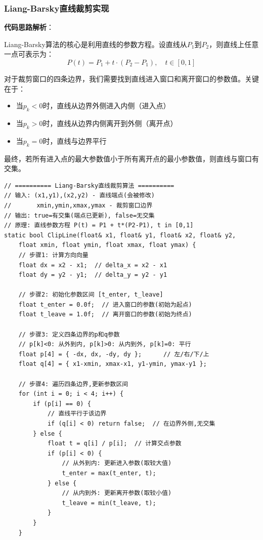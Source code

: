 \documentclass[12pt,a4paper]{article}
\begin{document}
\begin{tcolorbox}
\subsubsection{Liang-Barsky直线裁剪实现}

\textbf{代码思路解析}：

Liang-Barsky算法的核心是利用直线的参数方程。设直线从$P_1$到$P_2$，则直线上任意一点可表示为：
$$P(t) = P_1 + t \cdot (P_2 - P_1), \quad t \in [0, 1]$$

对于裁剪窗口的四条边界，我们需要找到直线进入窗口和离开窗口的参数值。关键在于：
\begin{itemize}
    \item 当$p_k < 0$时，直线从边界外侧进入内侧（进入点）
    \item 当$p_k > 0$时，直线从边界内侧离开到外侧（离开点）
    \item 当$p_k = 0$时，直线与边界平行
\end{itemize}

最终，若所有进入点的最大参数值小于所有离开点的最小参数值，则直线与窗口有交集。

\begin{lstlisting}[caption={Liang-Barsky直线裁剪算法}]
// ========== Liang-Barsky直线裁剪算法 ==========
// 输入: (x1,y1),(x2,y2) - 直线端点(会被修改)
//       xmin,ymin,xmax,ymax - 裁剪窗口边界
// 输出: true=有交集(端点已更新), false=无交集
// 原理: 直线参数方程 P(t) = P1 + t*(P2-P1), t in [0,1]
static bool ClipLine(float& x1, float& y1, float& x2, float& y2,
    float xmin, float ymin, float xmax, float ymax) {
    // 步骤1: 计算方向向量
    float dx = x2 - x1;  // delta_x = x2 - x1
    float dy = y2 - y1;  // delta_y = y2 - y1
    
    // 步骤2: 初始化参数区间 [t_enter, t_leave]
    float t_enter = 0.0f;  // 进入窗口的参数(初始为起点)
    float t_leave = 1.0f;  // 离开窗口的参数(初始为终点)
    
    // 步骤3: 定义四条边界的p和q参数
    // p[k]<0: 从外到内, p[k]>0: 从内到外, p[k]=0: 平行
    float p[4] = { -dx, dx, -dy, dy };      // 左/右/下/上
    float q[4] = { x1-xmin, xmax-x1, y1-ymin, ymax-y1 };
    
    // 步骤4: 遍历四条边界,更新参数区间
    for (int i = 0; i < 4; i++) {
        if (p[i] == 0) {
            // 直线平行于该边界
            if (q[i] < 0) return false;  // 在边界外侧,无交集
        } else {
            float t = q[i] / p[i];  // 计算交点参数
            if (p[i] < 0) {
                // 从外到内: 更新进入参数(取较大值)
                t_enter = max(t_enter, t);
            } else {
                // 从内到外: 更新离开参数(取较小值)
                t_leave = min(t_leave, t);
            }
        }
    }
    

\end{lstlisting}
\end{tcolorbox}
\end{document}
